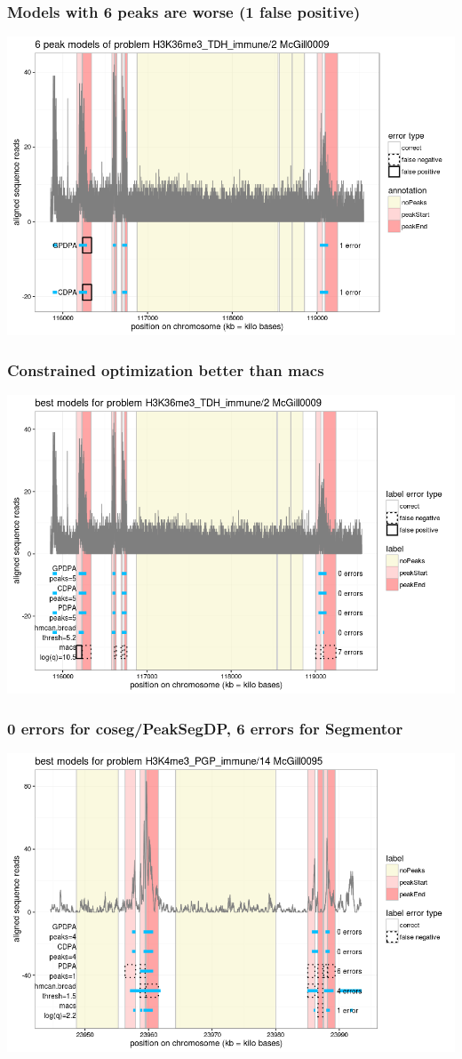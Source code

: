 \documentclass{beamer}
\begin{document}
\begin{frame}
  \frametitle{Models with 6 peaks are worse (1 false positive)}
  \includegraphics[width=\textwidth]{figure-min-train-error-problem5-6peaks}
\end{frame}

\begin{frame}
  \frametitle{Constrained optimization better than macs}
  \includegraphics[width=\textwidth]{figure-min-train-error-problem5-best}
\end{frame}

\begin{frame}
  \frametitle{0 errors for coseg/PeakSegDP, 6 errors for Segmentor}
  \includegraphics[width=\textwidth]{figure-min-train-error-problem2-best.png}
\end{frame}
\end{document}
